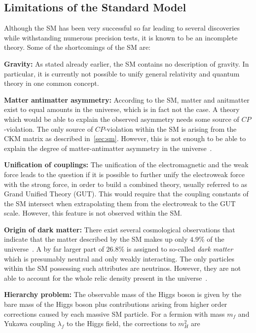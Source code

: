 \subsection{Limitations of the Standard Model}
\label{subsec:sm_shortcomings}
Although the SM has been very successful so far leading to several discoveries while withstanding numerous precision tests, it is known to be an incomplete theory. Some of the shortcomings of the SM are:
\begin{description}
\item \textbf{Gravity:} As stated already earlier, the SM contains no description of gravity. In particular, it is currently not possible to unify general relativity and quantum theory in one common concept.
\item \textbf{Matter antimatter asymmetry:} According to the SM, matter and anitmatter exist to equal amounts in the universe, which is in fact not the case. A theory which would be able to explain the observed asymmetry needs some source of $CP$-violation. The only source of $CP$-violation within the SM is arising from the CKM matrix as described in~\ref{sec:sm}. However, this is not enough to be able to explain the degree of matter-antimatter asymmetry in the universe~\cite{bib:CPViolation}.    
\item \textbf{Unification of couplings:} The unification of the electromagnetic and the weak force leads to the question if it is possible to further unify the electroweak force with the strong force, in order to build a combined theory, usually referred to as Grand Unified Theory (GUT). This would require that the coupling constants of the SM intersect when extrapolating them from the electroweak to the GUT scale. However, this feature is not observed within the SM.
\item \textbf{Origin of dark matter:} There exist several cosmological observations that indicate that the matter described by the SM makes up only $4.9$\% of the universe~\cite{Ade:2013zuv}. A by far larger part of $26.8$\% is assigned to so-called \textit{dark matter} which is presumably neutral and only weakly interacting. The only particles within the SM possessing such attributes are neutrinos. However, they are not able to account for the whole relic density present in the universe~\cite{Bertone:2004pz}. 
\item \textbf{Hierarchy problem:} The observable mass of the Higgs boson is given by the bare mass of the Higgs boson plus contributions arising from higher order corrections caused by each massive SM particle. For a fermion with mass $m_f$ and Yukawa coupling $\lambda_f$ to the Higgs field, the corrections to $m_H^2$ are

\end{description}
